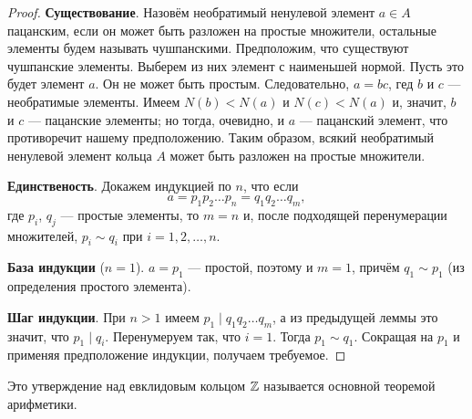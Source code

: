 \begin{proof}
    \textbf{Существование}. Назовём необратимый ненулевой элемент $a \in A$ пацанским, если он может быть разложен на простые множители, остальные элементы будем называть чушпанскими. Предположим, что существуют чушпанские элементы. Выберем из них элемент с наименьшей нормой. Пусть это будет элемент $a$. Он не может быть простым. Следовательно, $a = bc$, гед $b$ и $c$ --- необратимые элементы. Имеем $N(b) < N(a)$ и $N(c) < N(a)$ и, значит, $b$ и $c$ --- пацанские элементы; но тогда, очевидно, и $a$ --- пацанский элемент, что противоречит нашему предположению. Таким образом, всякий необратимый ненулевой элемент кольца $A$ может быть разложен на простые множители. 

    \textbf{Единственость}. Докажем индукцией по $n$, что если
    $$
    a = p_1p_2\ldots p_n = q_1q_2\ldots q_m,
    $$
    где $p_i$, $q_j$ --- простые элементы, то $m = n$ и, после подходящей перенумерации множителей, $p_i \sim q_i$ при $i = 1, 2, \ldots, n$.

    \textbf{База индукции} ($n = 1$). $a = p_1$ --- простой, поэтому и $m = 1$, причём $q_1 \sim p_1$ (из определения простого элемента).

    \textbf{Шаг индукции}. При $n > 1$ имеем $p_1 \mid q_1q_2\ldots q_m$, а из предыдущей леммы это значит, что $p_1 \mid q_i$. Перенумеруем так, что $i = 1$. Тогда $p_1 \sim q_1$. Сокращая на $p_1$ и применяя предположение индукции, получаем требуемое.
\end{proof}

\begin{remark}
    Это утверждение над евклидовым кольцом $\mathbb{Z}$ называется основной теоремой арифметики.
\end{remark}



